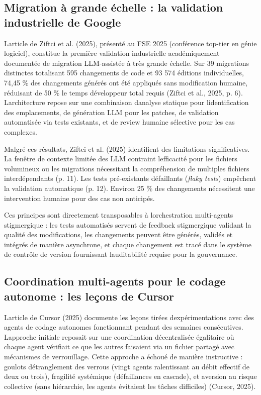 \documentclass[12pt,a4paper]{article}
\begin{document}
\subsection{Migration à grande échelle : la validation industrielle de
Google}\label{migration-uxe0-grande-uxe9chelle--la-validation-industrielle-de-google}

L\textquotesingle article de Ziftci et al. (2025), présenté au FSE 2025
(conférence top-tier en génie logiciel), constitue la première
validation industrielle académiquement documentée de migration
LLM-assistée à très grande échelle. Sur 39 migrations distinctes
totalisant 595 changements de code et 93 574 éditions individuelles,
74,45 \% des changements générés ont été appliqués sans modification
humaine, réduisant de 50 \% le temps développeur total requis (Ziftci et
al., 2025, p. 6). L\textquotesingle architecture repose sur une
combinaison d\textquotesingle analyse statique pour
l\textquotesingle identification des emplacements, de génération LLM
pour les patches, de validation automatisée via tests existants, et de
review humaine sélective pour les cas complexes.

Malgré ces résultats, Ziftci et al. (2025) identifient des limitations
significatives. La fenêtre de contexte limitée des LLM contraint
l\textquotesingle efficacité pour les fichiers volumineux ou les
migrations nécessitant la compréhension de multiples fichiers
interdépendants (p. 11). Les tests pré-existants défaillants
(\emph{flaky tests}) empêchent la validation automatique (p. 12).
Environ 25 \% des changements nécessitent une intervention humaine pour
des cas non anticipés.

Ces principes sont directement transposables à
l\textquotesingle orchestration multi-agents stigmergique : les tests
automatisés servent de feedback stigmergique validant la qualité des
modifications, les changements peuvent être générés, validés et intégrés
de manière asynchrone, et chaque changement est tracé dans le système de
contrôle de version fournissant l\textquotesingle auditabilité requise
pour la gouvernance.

\subsection{Coordination multi-agents pour le codage autonome : les
leçons de
Cursor}\label{coordination-multi-agents-pour-le-codage-autonome--les-leuxe7ons-de-cursor}

L\textquotesingle article de Cursor (2025) documente les leçons tirées
d\textquotesingle expérimentations avec des agents de codage autonomes
fonctionnant pendant des semaines consécutives.
L\textquotesingle approche initiale reposait sur une coordination
décentralisée égalitaire où chaque agent vérifiait ce que les autres
faisaient via un fichier partagé avec mécanismes de verrouillage. Cette
approche a échoué de manière instructive : goulots
d\textquotesingle étranglement des verrous (vingt agents ralentissant au
débit effectif de deux ou trois), fragilité systémique (défaillances en
cascade), et aversion au risque collective (sans hiérarchie, les agents
évitaient les tâches difficiles) (Cursor, 2025).
\end{document}
